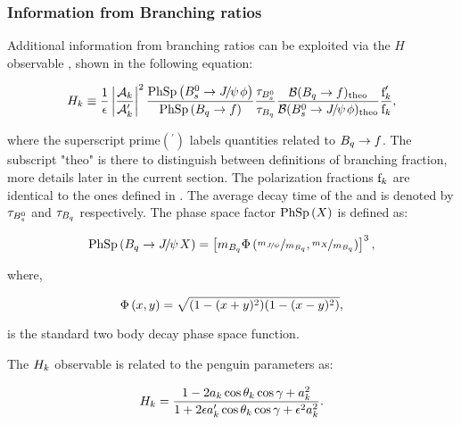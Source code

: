 \subsubsection{Information from Branching ratios}
Additional information from branching ratios can be exploited via the $H$ observable \cite{Fleischer:1999zi}, shown in
the following equation:

\begin{equation}
\centering
  \Hobs{k} \equiv   \frac{1}{\epsilon}
            \modulo{\frac{\formFctr{k}}{\formFctr{k}'}}^2
                    \frac{\PhSp{\BsJpsiPhi}} {\PhSp{\Bq\to f}}
                    \frac{\tau_{\Bs}}{\tau_{\Bq}}
                    \frac{\BRof{\Bq\to f}_{\rm theo}}{\BRof{\BsJpsiPhi}_{\rm theo}}
                    \frac{\fP{k}'}{{\fP{k}}},
\label{hobs_def}
\end{equation}

\noindent where the superscript prime$({}^\prime)$ labels quantities related to $B_q\rightarrow f$. The subscript "theo" is there
to distinguish between definitions of branching fraction, more details later in the current section.
The polarization fractions $\text{f}_{k}$ are identical to the ones defined in .
The average decay time of the \Bs and \Bq is denoted by $\tau_{B^0_s}$ and $\tau_{B_q}$ respectively.
The phase space factor ${\rm PhSp}\left( X \right)$ is defined as:

\begin{equation}
\centering
   \PhSp{\BJpsiX}  = \brackets{ \mass{\Bq} \PhSpPhi{ \nicefrac{\mass{\jpsi}}{\mass{\Bq}}, \nicefrac{\mass{X}}{\mass{\Bq}}  } }^3,
\label{phase_space_eq_def}
\end{equation}

\noindent where,

\begin{equation}
\centering
   \PhSpPhi{x,y} = \sqrt{ (1-(x+y)^2)(1-(x-y)^2) },
\label{phase_space_phi_eq_def}
\end{equation}

\noindent is the standard two body decay phase space function.

The $H_{k}$ observable is related to the penguin parameters \cite{Fleischer:1999zi} as:

\begin{equation}
\centering
  \Hobs{k} = \frac{1-2\akPeng\cos\thkPeng\cos\gamma + \akPeng^2}{1+2\epsilon\akPengPrime\cos\thkPeng\cos\gamma + \epsilon^2\akPeng^2}.
\label{Hobs_peng_param}
\end{equation}

